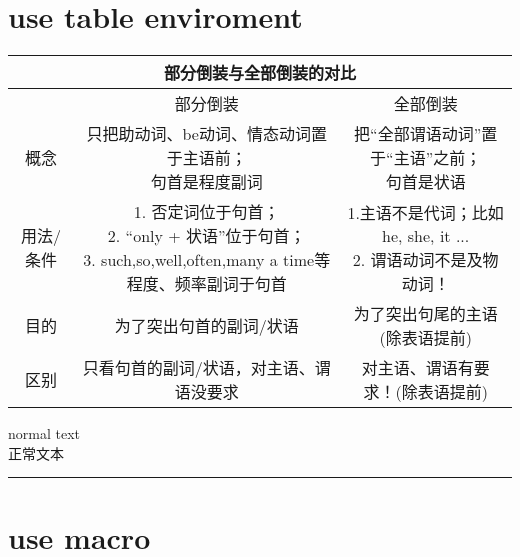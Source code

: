 \documentclass{ctexart}
\begin{document}
	\section{use table enviroment}
	\begin{table}[!h]

	\begin{tabular}{|c|c|c|}
		\hline
		\multicolumn{3}{|c|}{部分倒装与全部倒装的对比} \\
		\hline
		& 部分倒装 & 全部倒装 \\
		\hline
		概念 & \makecell*[c]{只把助动词、be动词、情态动词置于主语前；\\ 
			句首是程度副词} & \makecell*[c]{把“全部谓语动词”置于“主语”之前；\\ 
			句首是状语} \\
		\hline
		用法/条件 & \makecell*[l]{\hspace{2em}1. 否定词位于句首；\\ 
			\hspace{2em}2. “only + 状语”位于句首； \\ 
			\hspace{2em}3. such,so,well,often,many a time等 \\ 
			\hspace{2em}程度、频率副词于句首} & \makecell*[l]{\hspace{1em}1.主语不是代词；比如he, she, it ... \\ 
			\hspace{1em}2. 谓语动词不是及物动词！ } \\
		\hline
		目的 & 为了突出句首的副词/状语 & 为了突出句尾的主语(除表语提前)  \\
		\hline
		区别 & 只看句首的副词/状语，对主语、谓语没要求 & 对主语、谓语有要求！(除表语提前) \\
		\hline
	\end{tabular}
		
\end{table}
normal text\\
正常文本
	\vspace{2ex}
	\hrule
	\section{use macro}
	\vspace{2ex}
	
\end{document}
